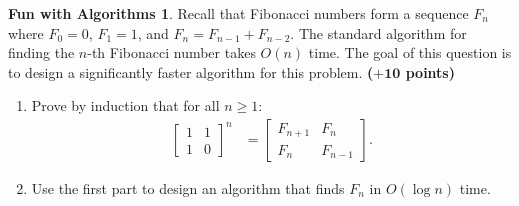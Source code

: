 \documentclass{article}
\theoremstyle{definition}
\newtheorem*{fun}{Fun with Algorithms}
\newcommand{\grade}[1]{\hfill{\textbf{($\mathbf{#1}$ points)}}}
\begin{document}
\begin{fun}
Recall that Fibonacci numbers form a sequence $F_n$ where $F_0 = 0$, $F_1 = 1$, and $F_n = F_{n-1} + F_{n-2}$. 
The standard algorithm for finding the $n$-th Fibonacci number takes $O(n)$ time. The goal of this question is to design a significantly faster algorithm for this problem. \grade{+10}
		\begin{enumerate}[label=(\alph*)]
		\item Prove by induction that for all $n \geq 1$: 
		\begin{align*}
			\begin{bmatrix}
				1 & 1 \\
				1 & 0
			\end{bmatrix}^n
			&= 	\begin{bmatrix}
				F_{n+1} & F_n \\
				F_n & F_{n-1}
			\end{bmatrix}.
		\end{align*}
		\item Use the first part to design an algorithm that finds $F_n$ in $O(\log{n})$ time. 
	\end{enumerate}	 
\end{fun}
\end{document}
